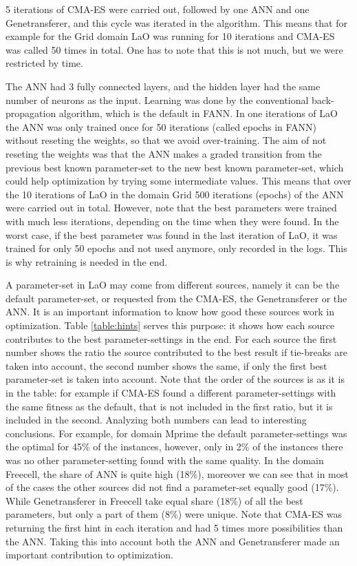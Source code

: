 \documentclass{MYsig-alternate}
\begin{document}
5 iterations of CMA-ES were carried out, followed by one ANN and one Genetransferer, and this cycle was iterated in the algorithm. This means that for example for the Grid domain LaO was running for 10 iterations and CMA-ES was called 50 times in total. One has to note that this is not much, but we were restricted by time.

The ANN had 3 fully connected layers, and the hidden layer had the same number of neurons as the input. Learning was done by the conventional back-propagation algorithm, which is the default in FANN. In one iterations of LaO the ANN was only trained once for 50 iterations (called epochs in FANN) without reseting the weights, so that we avoid over-training. The aim of not reseting the weights was that the ANN makes a graded transition from the previous best known parameter-set to the new best known parameter-set, which could help optimization by trying some intermediate values. This means that over the 10 iterations of LaO in the domain Grid 500 iterations (epochs) of the ANN were carried out in total. However, note that the best parameters were trained with much less iterations, depending on the time when they were found. In the worst case, if the best parameter was found in the last iteration of LaO, it was trained for only 50 epochs and not used anymore, only recorded in the logs. This is why retraining is needed in the end.

A parameter-set in LaO may come from different sources, namely it can be the default parameter-set, or requested from the CMA-ES, the Genetransferer or the ANN. It is an important information to know how good these sources work in optimization. Table \ref{table:hints} serves this purpose: it shows how each source contributes to the best parameter-settings in the end. For each source the first number shows the ratio the source contributed to the best result if tie-breaks are taken into account, the second number shows the same, if only the first best parameter-set is taken into account. Note that the order of the sources is as it is in the table: for example if CMA-ES found a different parameter-settings with the same fitness as the default, that is not included in the first ratio, but it is included in the second. Analyzing both numbers can lead to interesting conclusions. For example, for domain Mprime the default parameter-settings was the optimal for 45\% of the instances, however, only in 2\% of the instances there was no other parameter-setting found with the same quality. In the domain Freecell, the share of ANN is quite high (18\%), moreover we can see that in most of the cases the other sources did not find a parameter-set equally good (17\%). While Genetransferer in Freecell take equal share (18\%) of all the best parameters, but only a part of them (8\%) were unique. Note that CMA-ES was returning the first hint in each iteration and had 5 times more possibilities than the ANN. Taking this into account both the ANN and Genetransferer made an important contribution to optimization.
\end{document}
